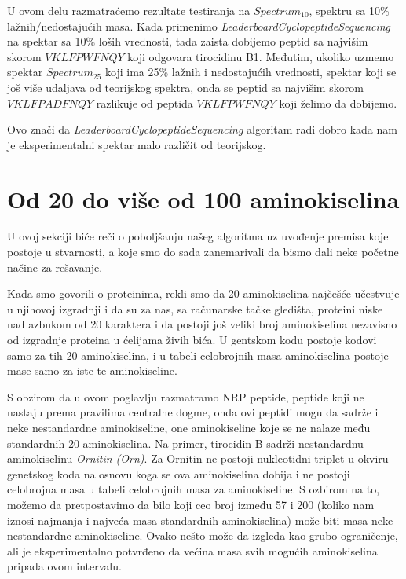 U ovom delu razmatraćemo rezultate testiranja na $Spectrum_{10}$, spektru sa 10\% lažnih/nedostajućih masa.  Kada primenimo \textit{LeaderboardCyclopeptideSequencing} na spektar sa 10\% loših vrednosti, tada zaista dobijemo peptid sa najvišim skorom $ VKLFPWFNQY $  koji odgovara tirocidinu B1. Međutim, ukoliko uzmemo spektar $Spectrum_{25}$ koji ima 25\% lažnih i nedostajućih vrednosti, spektar koji se još više udaljava od teorijskog spektra, onda se peptid sa najvišim skorom $ VKLFPADFNQY $ razlikuje od peptida  $ VKLFPWFNQY $ koji želimo da dobijemo.

Ovo znači da \textit{LeaderboardCyclopeptideSequencing} algoritam radi dobro kada nam je eksperimentalni spektar malo različit od teorijskog.

\section{Od 20 do više od 100 aminokiselina} \label{viseAmino}

U ovoj sekciji biće reči o poboljšanju našeg algoritma uz uvođenje premisa koje postoje u stvarnosti, a koje smo do sada zanemarivali da bismo dali neke početne načine za rešavanje.

Kada smo govorili o proteinima, rekli smo da 20 aminokiselina najčešće učestvuje u njihovoj izgradnji i da su za nas, sa računarske tačke gledišta, proteini niske nad azbukom od 20 karaktera i da postoji još veliki broj aminokiselina nezavisno od izgradnje proteina u ćelijama živih bića. U gentskom kodu postoje kodovi samo za tih 20 aminokiselina, i u tabeli celobrojnih masa aminokiselina postoje mase samo za iste te aminokiseline. 

S obzirom da u ovom poglavlju razmatramo NRP peptide, peptide koji ne nastaju prema pravilima centralne dogme,  onda ovi peptidi mogu da sadrže i neke nestandardne aminokiseline, one aminokiseline koje se ne nalaze među standardnih 20 aminokiselina. Na primer, tirocidin B sadrži nestandardnu aminokiselinu \textit{Ornitin (Orn)}. Za Ornitin ne postoji nukleotidni triplet u okviru genetskog koda na osnovu koga se ova aminokiselina dobija i ne postoji celobrojna masa u tabeli celobrojnih masa za aminokiseline. S ozbirom na to, možemo da pretpostavimo da bilo koji ceo broj između 57 i 200 (koliko nam iznosi najmanja i najveća masa standardnih aminokiselina) može biti masa neke nestandardne aminokiseline. Ovako nešto može da izgleda kao grubo ograničenje, ali je eksperimentalno potvrđeno da većina masa svih mogućih aminokiselina pripada ovom intervalu.

